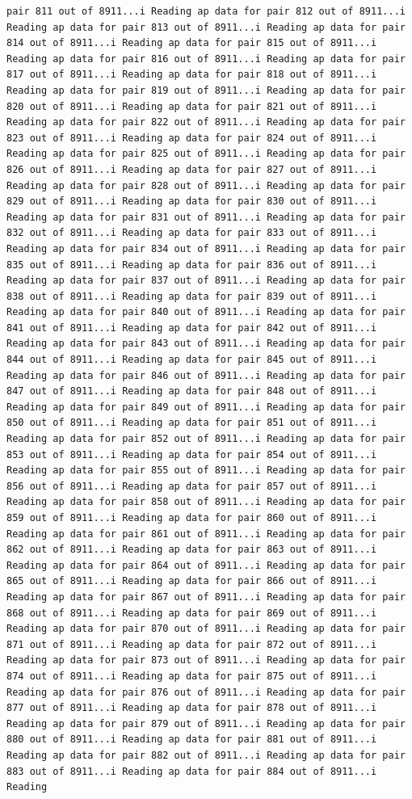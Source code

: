 \documentclass[
]{article}
\begin{document}
\begin{verbatim}
pair 811 out of 8911...i Reading ap data for pair 812 out of 8911...i Reading ap data for pair 813 out of 8911...i Reading ap data for pair 814 out of 8911...i Reading ap data for pair 815 out of 8911...i Reading ap data for pair 816 out of 8911...i Reading ap data for pair 817 out of 8911...i Reading ap data for pair 818 out of 8911...i Reading ap data for pair 819 out of 8911...i Reading ap data for pair 820 out of 8911...i Reading ap data for pair 821 out of 8911...i Reading ap data for pair 822 out of 8911...i Reading ap data for pair 823 out of 8911...i Reading ap data for pair 824 out of 8911...i Reading ap data for pair 825 out of 8911...i Reading ap data for pair 826 out of 8911...i Reading ap data for pair 827 out of 8911...i Reading ap data for pair 828 out of 8911...i Reading ap data for pair 829 out of 8911...i Reading ap data for pair 830 out of 8911...i Reading ap data for pair 831 out of 8911...i Reading ap data for pair 832 out of 8911...i Reading ap data for pair 833 out of 8911...i Reading ap data for pair 834 out of 8911...i Reading ap data for pair 835 out of 8911...i Reading ap data for pair 836 out of 8911...i Reading ap data for pair 837 out of 8911...i Reading ap data for pair 838 out of 8911...i Reading ap data for pair 839 out of 8911...i Reading ap data for pair 840 out of 8911...i Reading ap data for pair 841 out of 8911...i Reading ap data for pair 842 out of 8911...i Reading ap data for pair 843 out of 8911...i Reading ap data for pair 844 out of 8911...i Reading ap data for pair 845 out of 8911...i Reading ap data for pair 846 out of 8911...i Reading ap data for pair 847 out of 8911...i Reading ap data for pair 848 out of 8911...i Reading ap data for pair 849 out of 8911...i Reading ap data for pair 850 out of 8911...i Reading ap data for pair 851 out of 8911...i Reading ap data for pair 852 out of 8911...i Reading ap data for pair 853 out of 8911...i Reading ap data for pair 854 out of 8911...i Reading ap data for pair 855 out of 8911...i Reading ap data for pair 856 out of 8911...i Reading ap data for pair 857 out of 8911...i Reading ap data for pair 858 out of 8911...i Reading ap data for pair 859 out of 8911...i Reading ap data for pair 860 out of 8911...i Reading ap data for pair 861 out of 8911...i Reading ap data for pair 862 out of 8911...i Reading ap data for pair 863 out of 8911...i Reading ap data for pair 864 out of 8911...i Reading ap data for pair 865 out of 8911...i Reading ap data for pair 866 out of 8911...i Reading ap data for pair 867 out of 8911...i Reading ap data for pair 868 out of 8911...i Reading ap data for pair 869 out of 8911...i Reading ap data for pair 870 out of 8911...i Reading ap data for pair 871 out of 8911...i Reading ap data for pair 872 out of 8911...i Reading ap data for pair 873 out of 8911...i Reading ap data for pair 874 out of 8911...i Reading ap data for pair 875 out of 8911...i Reading ap data for pair 876 out of 8911...i Reading ap data for pair 877 out of 8911...i Reading ap data for pair 878 out of 8911...i Reading ap data for pair 879 out of 8911...i Reading ap data for pair 880 out of 8911...i Reading ap data for pair 881 out of 8911...i Reading ap data for pair 882 out of 8911...i Reading ap data for pair 883 out of 8911...i Reading ap data for pair 884 out of 8911...i Reading 
\end{verbatim}
\end{document}
